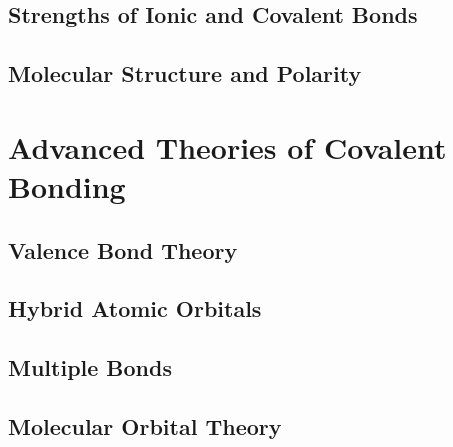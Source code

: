 \documentclass[12pt, openany, letterpaper]{memoir}
\begin{document}
\section{Strengths of Ionic and Covalent Bonds}

\section{Molecular Structure and Polarity}

\chapter{Advanced Theories of Covalent Bonding}

\section{Valence Bond Theory}

\section{Hybrid Atomic Orbitals}

\section{Multiple Bonds}

\section{Molecular Orbital Theory}
\end{document}
